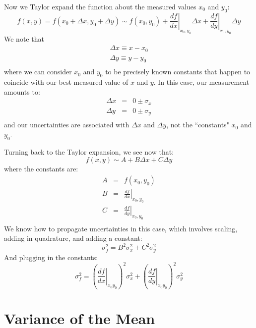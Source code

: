 \documentclass[12pt,oneside]{book}
\begin{document}
Now we Taylor expand the function about the measured values $x_0$ and $y_0$:
\begin{equation*}
f(x,y) = f(x_0+\Delta x,y_0 + \Delta y) \sim f(x_0,y_0) + \left.\frac{df}{dx}\right|_{x_0,y_0} \Delta x + \left.\frac{df}{dy}\right|_{x_0,y_0} \Delta y 
\end{equation*}
We note that 
\begin{eqnarray*}
\Delta x \equiv x - x_0 \\
\Delta y \equiv y - y_0 \\
\end{eqnarray*}
where we can consider $x_0$ and $y_0$ to be precisely known constants that happen to coincide with our best measured value of $x$ and $y$.  In this case, our measurement amounts to:
\begin{eqnarray*}
\Delta x &=& 0 \pm \sigma_x\\
\Delta y &=& 0 \pm \sigma_y\\
\end{eqnarray*}
and our uncertainties are associated with $\Delta x$ and $\Delta y$, not the ``constants" $x_0$ and $y_0$.

Turning back to the Taylor expansion, we see now that:
\begin{equation*}
f(x,y) \sim A + B \Delta x + C \Delta y 
\end{equation*}
where the constants are:
\begin{eqnarray*}
A  &=& f(x_0,y_0)\\
B  &=& \left.\frac{df}{dx}\right|_{x_0,y_0}\\
C  &=& \left.\frac{df}{dy}\right|_{x_0,y_0}\\
\end{eqnarray*}
We know how to propagate uncertainties in this case, which involves scaling, adding in quadrature, and adding a constant:
\begin{equation*}
\sigma_f^2 =   B^2 \sigma_x^2 + C^2 \sigma_y^2 
\end{equation*}
And plugging in the constants:
\begin{equation*}
\sigma^2_f = \left(\left.\frac{df}{dx}\right|_{x_0 y_0} \right)^2 \sigma^2_x  + \left( \left.\frac{df}{dy} \right|_{x_0 y_0} \right)^2 \sigma^2_y
\end{equation*}   

\section{Variance of the Mean}
\end{document}
